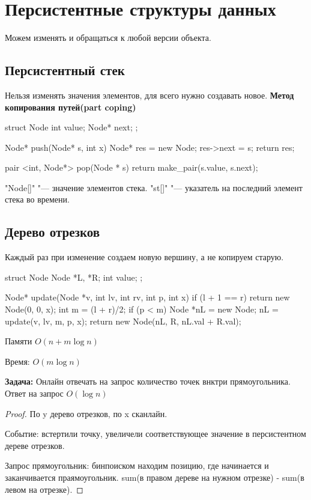 \chapter{Персистентные структуры данных}
Можем изменять и обращаться к любой версии объекта.
\section{Персистентный стек}
Нельзя изменять значения элементов, для всего нужно создавать новое.
\textbf{Метод копирования путей(part coping)}
\begin{cppcode}
struct Node {
    int value;
    Node* next;
};

Node* push(Node* s, int x) {
    Node* res = new Node;
    res->next = s;
    return res;
}

pair <int, Node*> pop(Node * s) {
    return make_pair(s.value, s.next);
}
\end{cppcode}

\cpp"Node[]" "--- значение элементов стека.
\cpp"st[]" "--- указатель на последний элемент стека во времени.

\section{Дерево отрезков}
Каждый раз при изменение создаем новую вершину, а не копируем старую.

\begin{cppcode}
struct Node {
    Node *L, *R;
    int value;
};

Node* update(Node *v, int lv, int rv, int p, int x) {
    if (l + 1 == r) {
        return new Node(0, 0, x);
    }
    int m = (l + r)/2;
    if (p < m) {
        Node *nL = new Node;
        nL = update(v, lv, m, p, x);
        return new Node(nL, R, nL.val + R.val);
    }
}
\end{cppcode}

Памяти $O(n + m \log n)$

Время: $O(m \log n)$

\textbf{Задача:} Онлайн отвечать на запрос количество точек внктри прямоугольника.
Ответ на запрос $O(\log n)$
\begin{proof}
По y дерево отрезков, по x сканлайн. 

Событие: встертили точку, увеличели соответствующее значение в персистентном дереве отрезков.

Запрос прямоугольник: бинпоиском находим позицию, где начинается и заканчивается
праямоугольник. sum(в правом дереве на нужном отрезке) - sum(в левом на отрезке).
\end{proof}

